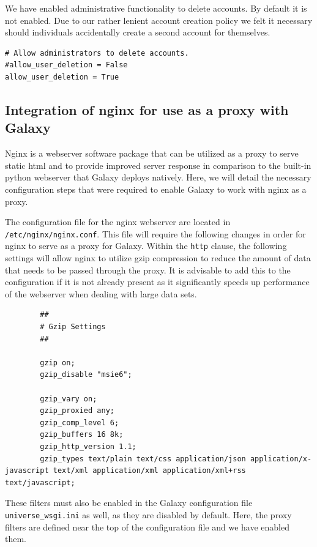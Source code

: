 \documentclass[a4paper,10pt]{article}
\begin{document}
We have enabled administrative functionality to delete accounts.  By default it is not enabled.  Due to our rather lenient account creation policy we felt it necessary should individuals accidentally create a second account for themselves.
\begin{lstlisting}
# Allow administrators to delete accounts.
#allow_user_deletion = False
allow_user_deletion = True
\end{lstlisting}

\subsection{Integration of nginx for use as a proxy with Galaxy}
Nginx is a webserver software package that can be utilized as a proxy to serve static html and to provide improved server response in comparison to the built-in python webserver that Galaxy deploys natively.  Here, we will detail the necessary configuration steps that were required to enable Galaxy to work with nginx as a proxy.

The configuration file for the nginx webserver are located in \texttt{\footnotesize{/etc/nginx/nginx.conf}}.  This file will require the following changes in order for nginx to serve as a proxy for Galaxy.
Within the \texttt{\footnotesize{http}} clause, the following settings will allow nginx to utilize gzip compression to reduce the amount of data that needs to be passed through the proxy.  It is advisable to add this to the configuration if it is not already present as it significantly speeds up performance of the webserver when dealing with large data sets.

\begin{lstlisting}
        ##
        # Gzip Settings
        ##

        gzip on;
        gzip_disable "msie6";

        gzip_vary on;
        gzip_proxied any;
        gzip_comp_level 6;
        gzip_buffers 16 8k;
        gzip_http_version 1.1;
        gzip_types text/plain text/css application/json application/x-javascript text/xml application/xml application/xml+rss text/javascript;
\end{lstlisting}

These filters must also be enabled in the Galaxy configuration file \texttt{\footnotesize{universe\_wsgi.ini}} as well, as they are disabled by default.  Here, the proxy filters are defined near the top of the configuration file and we have enabled them.
\end{document}
